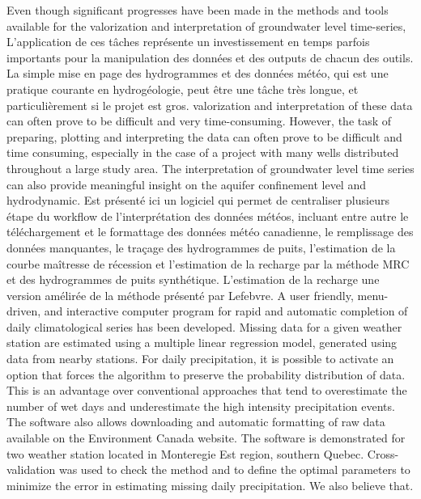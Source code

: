 \documentclass[ARTICLETHERMIC.tex]{subfiles}
\begin{document}
Even though significant progresses have been made in the methods and tools available for the valorization and interpretation of groundwater level time-series,  L'application de ces tâches représente un investissement en temps parfois importants pour la manipulation des données et des outputs de chacun des outils. La simple mise en page des hydrogrammes et des données météo, qui est une pratique courante en hydrogéologie, peut être une tâche très longue, et particulièrement si le projet est gros. valorization and interpretation of these data can often prove to be difficult and very time-consuming. However, the task of preparing, plotting and interpreting the data can often prove to be difficult and time consuming, especially in the case of a project with many wells distributed throughout a large study area. The interpretation of groundwater level time series can also provide meaningful insight on the aquifer confinement level and hydrodynamic. 
Est présenté ici un logiciel qui permet de centraliser plusieurs étape du workflow de l'interprétation des données météos, incluant entre autre le téléchargement et le formattage des données météo canadienne, le remplissage des données manquantes, le traçage des hydrogrammes de puits, l'estimation de la courbe maîtresse de récession et l'estimation de la recharge par la méthode MRC et des hydrogrammes de puits synthétique. L'estimation de la recharge une version amélirée de la méthode présenté par Lefebvre. A user friendly, menu-driven, and interactive computer program for rapid and automatic completion of daily climatological series has been developed. Missing data for a given weather station are estimated using a multiple linear regression model, generated using data from nearby stations. For daily precipitation, it is possible to activate an option that forces the algorithm to preserve the probability distribution of data. This is an advantage over conventional approaches that tend to overestimate the number of wet days and underestimate the high intensity precipitation events. The software also allows downloading and automatic formatting of raw data available on the Environment Canada website. The software is demonstrated for two weather station located in Monteregie Est region, southern Quebec. Cross-validation was used to check the method and to define the optimal parameters to minimize the error in estimating missing daily precipitation. We also believe that. 
\end{document}
